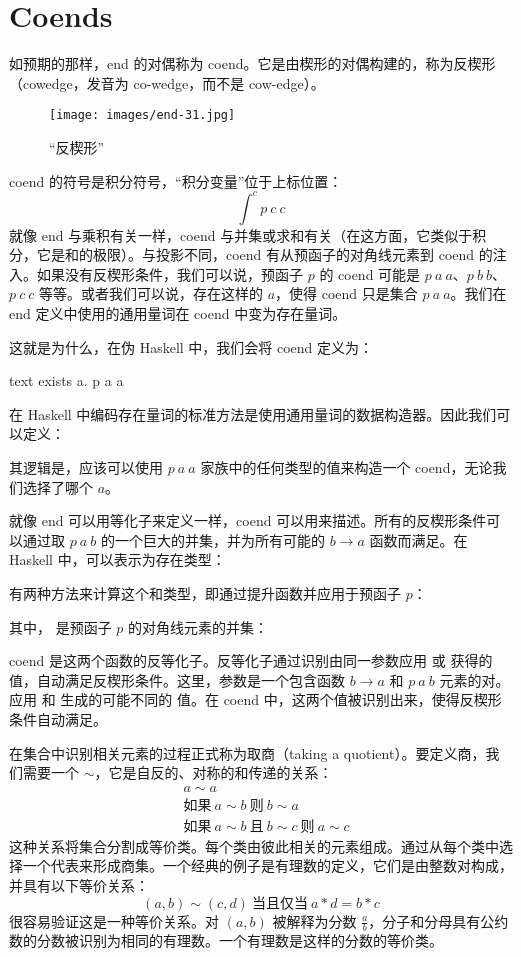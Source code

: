 \section{Coends}
如预期的那样，end 的对偶称为 coend。它是由楔形的对偶构建的，称为反楔形（cowedge，发音为 co-wedge，而不是 cow-edge）。

\begin{figure}[H]
  \centering
  \texttt{[image: images/end-31.jpg]}
  \caption{“反楔形”}
\end{figure}

\noindent
coend 的符号是积分符号，“积分变量”位于上标位置：
\[\int^c p\ c\ c\]
就像 end 与乘积有关一样，coend 与并集或求和有关（在这方面，它类似于积分，它是和的极限）。与投影不同，coend 有从预函子的对角线元素到 coend 的注入。如果没有反楔形条件，我们可以说，预函子 $p$ 的 coend 可能是 $p\ a\ a$、$p\ b\ b$、$p\ c\ c$ 等等。或者我们可以说，存在这样的 $a$，使得 coend 只是集合 $p\ a\ a$。我们在 end 定义中使用的通用量词在 coend 中变为存在量词。

这就是为什么，在伪 Haskell 中，我们会将 coend 定义为：

\begin{snip}{text}
  exists a. p a a
\end{snip}
在 Haskell 中编码存在量词的标准方法是使用通用量词的数据构造器。因此我们可以定义：

其逻辑是，应该可以使用 $p\ a\ a$ 家族中的任何类型的值来构造一个 coend，无论我们选择了哪个 $a$。

就像 end 可以用等化子来定义一样，coend 可以用来描述。所有的反楔形条件可以通过取 $p\ a\ b$ 的一个巨大的并集，并为所有可能的 $b \to a$ 函数而满足。在 Haskell 中，可以表示为存在类型：

有两种方法来计算这个和类型，即通过提升函数并应用于预函子 $p$：

其中， 是预函子 $p$ 的对角线元素的并集：

coend 是这两个函数的反等化子。反等化子通过识别由同一参数应用  或  获得的值，自动满足反楔形条件。这里，参数是一个包含函数 $b \to a$ 和 $p\ a\ b$ 元素的对。应用  和  生成的可能不同的  值。在 coend 中，这两个值被识别出来，使得反楔形条件自动满足。

在集合中识别相关元素的过程正式称为取商（taking a quotient）。要定义商，我们需要一个 $\sim$，它是自反的、对称的和传递的关系：
\begin{align*}
  & a \sim a                                                         \\
  & \text{如果}\ a \sim b\ \text{则}\ b \sim a                       \\
  & \text{如果}\ a \sim b\ \text{且}\ b \sim c\ \text{则}\ a \sim c
\end{align*}
这种关系将集合分割成等价类。每个类由彼此相关的元素组成。通过从每个类中选择一个代表来形成商集。一个经典的例子是有理数的定义，它们是由整数对构成，并具有以下等价关系：
\[(a, b) \sim (c, d)\ \text{当且仅当}\ a * d = b * c\]
很容易验证这是一种等价关系。对 $(a, b)$ 被解释为分数 $\frac{a}{b}$，分子和分母具有公约数的分数被识别为相同的有理数。一个有理数是这样的分数的等价类。

